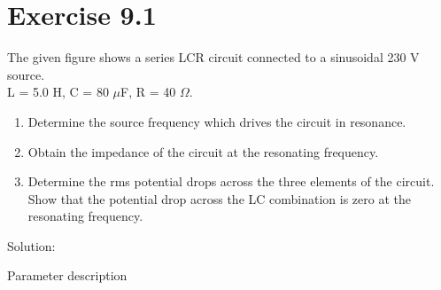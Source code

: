 \documentclass[journal,12pt,twocolumn]{IEEEtran}
\begin{document}


\vspace{3cm}

\title{}
\author{EE23BTECH11217 - Prajwal M$^{*}$
}
\maketitle
\newpage
\bigskip

\renewcommand{\thefigure}{\theenumi}
\renewcommand{\thetable}{\theenumi}

\section*{Exercise 9.1}
The given figure shows a series LCR circuit connected to a sinusoidal 230 V source. \\
L = 5.0 H, C = 80 $\mu$F, R = 40 $\Omega$.

\begin{figure}[h]

\end{figure}

\begin{enumerate}
    \item Determine the source frequency which drives the circuit in resonance.
    \item Obtain the impedance of the circuit
at the resonating frequency.
    \item Determine the rms potential drops across the three elements of
the circuit. Show that the potential drop across the LC
combination is zero at the resonating frequency.\\
\end{enumerate}

Solution:
\begin{table}[h]
    \centering
    
    \caption{Parameter description}
    \label{tab:217.tab.1}
\end{table}
\begin{figure}[h]
	
\end{figure}
\end{document}
